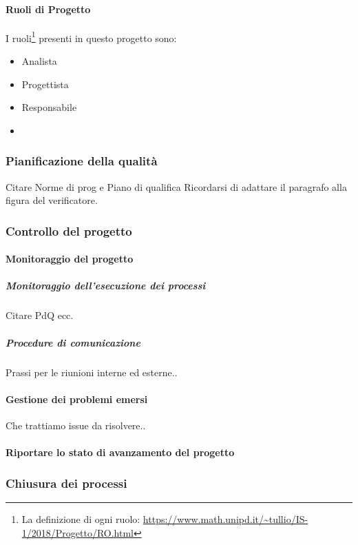 			\paragraph{Ruoli di Progetto}
			I ruoli\footnote{La definizione di ogni ruolo: \url{https://www.math.unipd.it/~tullio/IS-1/2018/Progetto/RO.html}} presenti in questo progetto sono:
			\begin{itemize}
				\item Analista
				\item Progettista
				\item Responsabile
				\item 
			\end{itemize}
			 
		
		\subsubsection{Pianificazione della qualità}
		Citare Norme di prog e Piano di qualifica
		Ricordarsi di adattare il paragrafo alla figura del verificatore.
		
		\subsubsection{Controllo del progetto}
		
			\paragraph{Monitoraggio del progetto}
			
			\subparagraph{Monitoraggio dell'esecuzione dei processi}
			Citare PdQ ecc.
			
			\subparagraph{Procedure di comunicazione}
    		Prassi per le riunioni interne ed esterne..
    		
    		
    		\paragraph{Gestione dei problemi emersi}
    		Che trattiamo issue da risolvere..
    		
    		\paragraph{Riportare lo stato di avanzamento del progetto}
    		
    		
    	\subsubsection{Chiusura dei processi}	
    	
